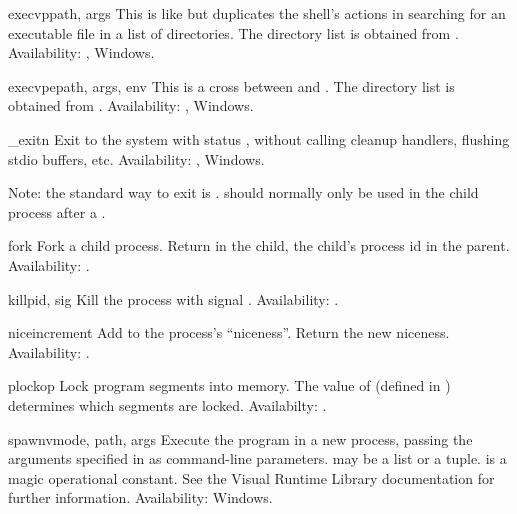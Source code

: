 \begin{funcdesc}{execvp}{path, args}
This is like  but duplicates
the shell's actions in searching for an executable file in a list of
directories.  The directory list is obtained from
.
Availability: \UNIX{}, Windows.
\end{funcdesc}

\begin{funcdesc}{execvpe}{path, args, env}
This is a cross between  and .
The directory list is obtained from .
Availability: \UNIX{}, Windows.
\end{funcdesc}

\begin{funcdesc}{_exit}{n}
Exit to the system with status , without calling cleanup
handlers, flushing stdio buffers, etc.
Availability: \UNIX{}, Windows.

Note: the standard way to exit is .
 should normally only be used in the child process
after a .
\end{funcdesc}

\begin{funcdesc}{fork}{}
Fork a child process.  Return  in the child, the child's
process id in the parent.
Availability: \UNIX{}.
\end{funcdesc}

\begin{funcdesc}{kill}{pid, sig}
Kill the process  with signal .
Availability: \UNIX{}.
\end{funcdesc}

\begin{funcdesc}{nice}{increment}
Add  to the process's ``niceness''.  Return the new
niceness.
Availability: \UNIX{}.
\end{funcdesc}

\begin{funcdesc}{plock}{op}
Lock program segments into memory.  The value of 
(defined in ) determines which segments are locked.
Availabilty: \UNIX{}.
\end{funcdesc}

\begin{funcdesc}{spawnv}{mode, path, args}
Execute the program  in a new process, passing the arguments 
specified in  as command-line parameters.   may be 
a list or a tuple.   is a magic operational constant.  See
the Visual \Cpp{} Runtime Library documentation for further
information.
Availability: Windows.
\end{funcdesc}

